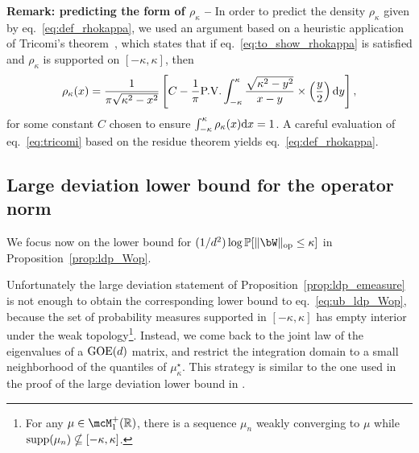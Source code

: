 \myskip
\textbf{Remark: predicting the form of $\rho_\kappa$ --} In order to predict the density $\rho_\kappa$ given by eq.~\eqref{eq:def_rhokappa}, 
we used an argument based on a heuristic application of Tricomi's theorem~\citep{tricomi1985integral}, which states that if eq.~\eqref{eq:to_show_rhokappa} is satisfied 
and $\rho_\kappa$ is supported on $[-\kappa,\kappa]$, then 
\begin{equation}\label{eq:tricomi}
    \rho_\kappa(x) = \frac{1}{\pi \sqrt{\kappa^2-x^2}}\left[C - \frac{1}{\pi} \textrm{P.V.} \int_{-\kappa}^\kappa \frac{\sqrt{\kappa^2-y^2}}{x-y} \times \left(\frac{y}{2}\right) \mathrm{d} y\right],
\end{equation}
for some constant $C$ chosen to ensure $\int_{-\kappa}^\kappa \rho_\kappa(x) \mathrm{d} x = 1$.
A careful evaluation of eq.~\eqref{eq:tricomi} based on the residue theorem yields eq.~\eqref{eq:def_rhokappa}.

\subsection{Large deviation lower bound for the operator norm}

We focus now on the lower bound for $(1/d^2) \log \bbP[\|\bW\|_\op \leq \kappa]$ in Proposition~\ref{prop:ldp_Wop}.

\myskip
Unfortunately the large deviation statement of Proposition~\ref{prop:ldp_emeasure} is not enough to obtain the corresponding lower bound to eq.~\eqref{eq:ub_ldp_Wop}, 
because the set of probability measures supported in $[-\kappa,\kappa]$ has empty interior under the weak topology\footnote{For any $\mu \in \mcM_1^+(\bbR)$, there is a sequence $\mu_n$ weakly converging to $\mu$ while $ \operatorname*{supp}(\mu_n) \nsubseteq [-\kappa,\kappa]$.}. 
Instead, we come back to the joint law of the eigenvalues of a $\mathrm{GOE}(d)$ matrix, and 
restrict the integration domain to a small neighborhood of the quantiles of $\mu_\kappa^\star$.
This strategy is similar to the one used in the proof of the large deviation lower bound in \cite{arous1997large}.

